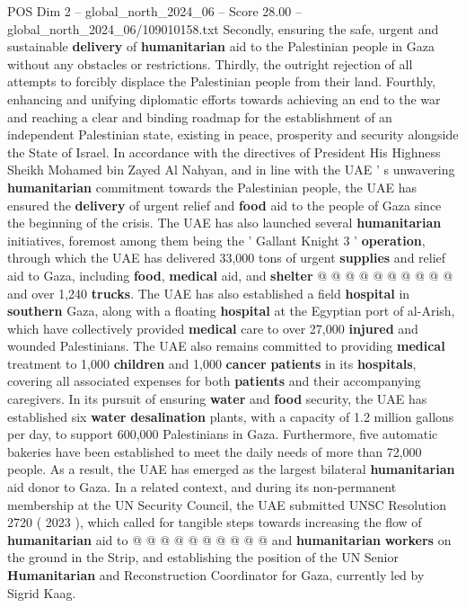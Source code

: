 \begin{textsample}{POS Dim 2 – global\_north\_2024\_06 – Score 28.00 – global\_north\_2024\_06/109010158.txt}
Secondly, ensuring the safe, urgent and sustainable \textbf{delivery} of \textbf{humanitarian} aid to the Palestinian people in Gaza without any obstacles or restrictions.
Thirdly, the outright rejection of all attempts to forcibly displace the Palestinian people from their land.
Fourthly, enhancing and unifying diplomatic efforts towards achieving an end to the war and reaching a clear and binding roadmap for the establishment of an independent Palestinian state, existing in peace, prosperity and security alongside the State of Israel.
In accordance with the directives of President His Highness Sheikh Mohamed bin Zayed Al Nahyan, and in line with the UAE ' s unwavering \textbf{humanitarian} commitment towards the Palestinian people, the UAE has ensured the \textbf{delivery} of urgent relief and \textbf{food} aid to the people of Gaza since the beginning of the crisis.
The UAE has also launched several \textbf{humanitarian} initiatives, foremost among them being the ' Gallant Knight 3 ' \textbf{operation}, through which the UAE has delivered 33,000 tons of urgent \textbf{supplies} and relief aid to Gaza, including \textbf{food}, \textbf{medical} aid, and \textbf{shelter} @ @ @ @ @ @ @ @ @ @ and over 1,240 \textbf{trucks}.
The UAE has also established a field \textbf{hospital} in \textbf{southern} Gaza, along with a floating \textbf{hospital} at the Egyptian port of al-Arish, which have collectively provided \textbf{medical} care to over 27,000 \textbf{injured} and wounded Palestinians.
The UAE also remains committed to providing \textbf{medical} treatment to 1,000 \textbf{children} and 1,000 \textbf{cancer} \textbf{patients} in its \textbf{hospitals}, covering all associated expenses for both \textbf{patients} and their accompanying caregivers.
In its pursuit of ensuring \textbf{water} and \textbf{food} security, the UAE has established six \textbf{water} \textbf{desalination} plants, with a capacity of 1.2 million gallons per day, to support 600,000 Palestinians in Gaza.
Furthermore, five automatic bakeries have been established to meet the daily needs of more than 72,000 people.
As a result, the UAE has emerged as the largest bilateral \textbf{humanitarian} aid donor to Gaza.
In a related context, and during its non-permanent membership at the UN Security Council, the UAE submitted UNSC Resolution 2720 ( 2023 ), which called for tangible steps towards increasing the flow of \textbf{humanitarian} aid to @ @ @ @ @ @ @ @ @ @ and \textbf{humanitarian} \textbf{workers} on the ground in the Strip, and establishing the position of the UN Senior \textbf{Humanitarian} and Reconstruction Coordinator for Gaza, currently led by Sigrid Kaag.

\end{textsample}

